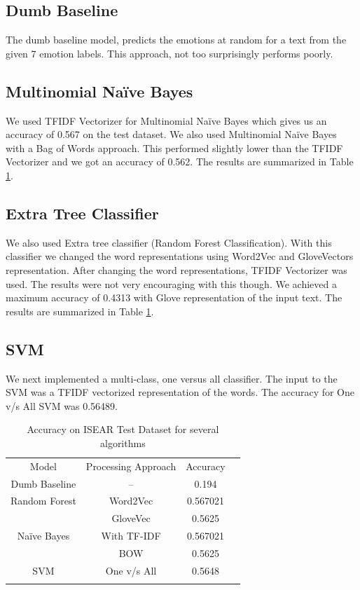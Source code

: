 \documentclass[conference]{IEEEtran}
\numberwithin{equation}{section}
\numberwithin{figure}{section}
\numberwithin{table}{section}
\begin{document}
\subsection{Dumb Baseline}
The dumb baseline model, predicts the emotions at random for a text from the given 7 emotion labels. This approach, not too surprisingly performs poorly.

\subsection{Multinomial Na{\"i}ve Bayes}
We used TFIDF Vectorizer for Multinomial Na{\"i}ve Bayes which gives us an accuracy of 0.567 on the test dataset. We also used Multinomial Na{\"i}ve Bayes with a Bag of Words approach. This performed slightly lower than the TFIDF Vectorizer and we got an accuracy of 0.562. The results are summarized in Table \ref{tab_nb}. 

\subsection{Extra Tree Classifier}
We also used Extra tree classifier (Random Forest Classification). With this classifier we changed the word representations using Word2Vec and GloveVectors representation. After changing the word representations, TFIDF Vectorizer was used. The results were not very encouraging with this though. We achieved a maximum accuracy of 0.4313 with Glove representation of the input text. The results are summarized in Table \ref{tab_nb}.

\subsection{SVM	}
We next implemented a multi-class, one versus all classifier. The input to the SVM was a TFIDF vectorized representation of the words. The accuracy for One v/s All SVM was 0.56489. 

\begin{table}[!htb]
 \centering
 \caption{Accuracy on ISEAR Test Dataset for several algorithms}
 \label{tab_nb}
\begin{tabular}{ c c c c  } 
    \noalign{\smallskip}\hline\noalign{\smallskip}
   Model &  Processing Approach & Accuracy \\
       \noalign{\smallskip}\hline\noalign{\smallskip}
\multirow{1}{8em} {Dumb Baseline} &   -- & 0.194\\
    \noalign{\smallskip}\hline\noalign{\smallskip}
\multirow{2}{8em} {Random Forest} &   Word2Vec & 0.567021\\
&  GloveVec & 0.5625\\                
 \noalign{\smallskip}\hline\noalign{\smallskip}
\multirow{2}{8em} {Na{\"i}ve Bayes} &   With TF-IDF & 0.567021\\
&  BOW & 0.5625\\                
 \noalign{\smallskip}\hline\noalign{\smallskip}
\multirow{1}{8em} {SVM} &  One v/s All & 0.5648\\
    \noalign{\smallskip}\hline
  \end{tabular} 
\end{table}
\end{document}
